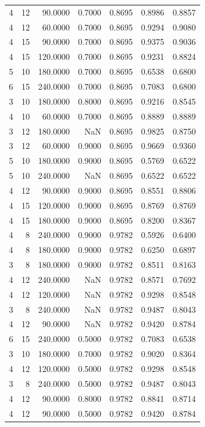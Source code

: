 \begin{tabular}{rrrrrrr}
4 & 12 & 90.0000 & 0.7000 & 0.8695 & 0.8986 & 0.8857 \\
4 & 12 & 60.0000 & 0.7000 & 0.8695 & 0.9294 & 0.9080 \\
4 & 15 & 90.0000 & 0.7000 & 0.8695 & 0.9375 & 0.9036 \\
4 & 15 & 120.0000 & 0.7000 & 0.8695 & 0.9231 & 0.8824 \\
5 & 10 & 180.0000 & 0.7000 & 0.8695 & 0.6538 & 0.6800 \\
6 & 15 & 240.0000 & 0.7000 & 0.8695 & 0.7083 & 0.6800 \\
3 & 10 & 180.0000 & 0.8000 & 0.8695 & 0.9216 & 0.8545 \\
4 & 10 & 60.0000 & 0.7000 & 0.8695 & 0.8889 & 0.8889 \\
3 & 12 & 180.0000 & NaN & 0.8695 & 0.9825 & 0.8750 \\
3 & 12 & 60.0000 & 0.9000 & 0.8695 & 0.9669 & 0.9360 \\
5 & 10 & 180.0000 & 0.9000 & 0.8695 & 0.5769 & 0.6522 \\
5 & 10 & 240.0000 & NaN & 0.8695 & 0.6522 & 0.6522 \\
4 & 12 & 90.0000 & 0.9000 & 0.8695 & 0.8551 & 0.8806 \\
4 & 15 & 120.0000 & 0.9000 & 0.8695 & 0.8769 & 0.8769 \\
4 & 15 & 180.0000 & 0.9000 & 0.8695 & 0.8200 & 0.8367 \\
4 & 8 & 240.0000 & 0.9000 & 0.9782 & 0.5926 & 0.6400 \\
4 & 8 & 180.0000 & 0.9000 & 0.9782 & 0.6250 & 0.6897 \\
3 & 8 & 180.0000 & 0.9000 & 0.9782 & 0.8511 & 0.8163 \\
4 & 12 & 240.0000 & NaN & 0.9782 & 0.8571 & 0.7692 \\
4 & 12 & 120.0000 & NaN & 0.9782 & 0.9298 & 0.8548 \\
3 & 8 & 240.0000 & NaN & 0.9782 & 0.9487 & 0.8043 \\
4 & 12 & 90.0000 & NaN & 0.9782 & 0.9420 & 0.8784 \\
6 & 15 & 240.0000 & 0.5000 & 0.9782 & 0.7083 & 0.6538 \\
3 & 10 & 180.0000 & 0.7000 & 0.9782 & 0.9020 & 0.8364 \\
4 & 12 & 120.0000 & 0.5000 & 0.9782 & 0.9298 & 0.8548 \\
3 & 8 & 240.0000 & 0.5000 & 0.9782 & 0.9487 & 0.8043 \\
4 & 12 & 90.0000 & 0.8000 & 0.9782 & 0.8841 & 0.8714 \\
4 & 12 & 90.0000 & 0.5000 & 0.9782 & 0.9420 & 0.8784 \\

\end{tabular}
